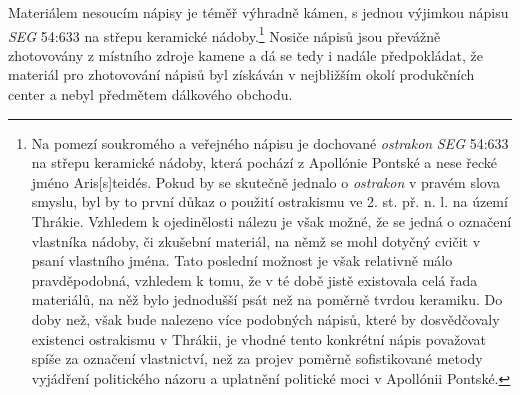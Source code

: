 Materiálem nesoucím nápisy je téměř výhradně kámen, s jednou výjimkou nápisu {\em SEG} 54:633 na střepu keramické nádoby.\footnote{Na pomezí soukromého a veřejného nápisu je dochované {\em ostrakon} {\em SEG} 54:633 na střepu keramické nádoby, která pochází z Apollónie Pontské a nese řecké jméno Aris{[}s{]}teidés. Pokud by se skutečně jednalo o {\em ostrakon} v pravém slova smyslu, byl by to první důkaz o použití ostrakismu ve 2. st. př. n. l. na území Thrákie. Vzhledem k ojedinělosti nálezu je však možné, že se jedná o označení vlastníka nádoby, či zkušební materiál, na němž se mohl dotyčný cvičit v psaní vlastního jména. Tato poslední možnost je však relativně málo pravděpodobná, vzhledem k tomu, že v té době jistě existovala celá řada materiálů, na něž bylo jednodušší psát než na poměrně tvrdou keramiku. Do doby než, však bude nalezeno více podobných nápisů, které by dosvědčovaly existenci ostrakismu v Thrákii, je vhodné tento konkrétní nápis považovat spíše za označení vlastnictví, než za projev poměrně sofistikované metody vyjádření politického názoru a uplatnění politické moci v Apollónii Pontské.} Nosiče nápisů jsou převážně zhotovovány z místního zdroje kamene a dá se tedy i nadále předpokládat, že materiál pro zhotovování nápisů byl získáván v nejbližším okolí produkčních center a nebyl předmětem dálkového obchodu.

